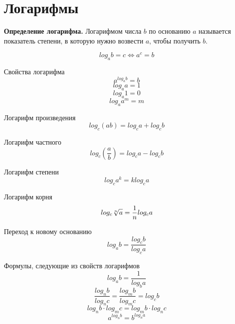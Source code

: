 \documentclass[a4paper, 12pt]{article}
\begin{document}
\section{Логарифмы}
\textbf{Определение логарифма.} Логарифмом числа $b$ по основанию $a$ называется показатель степени, в которую нужно возвести $a$, чтобы получить $b.$

$$log_ab=c \Leftrightarrow a^c=b$$
 
Свойства логарифма
$$a^{log_ab}=b$$
$$log_aa=1$$
$$log_a1=0$$
$$log_aa^m=m$$

Логарифм произведения
$$log_c(ab)=log_ca+log_cb$$

Логарифм частного
$$log_c(\frac{a}{b})=log_ca-log_cb$$

Логарифм степени
$$log_ca^k=klog_ca$$

Логарифм корня
$$log_c \root{n}\of{a}=\frac{1}{n}log_ca$$

Переход к новому основанию
$$log_ab=\frac{log_cb}{log_ca}$$

Формулы, следующие из свойств логарифмов
$$log_ab=\frac{1}{log_ba}$$
$$\frac{log_nb}{log_nc}=\frac{log_mb}{log_mc}=log_cb$$
$$log_nb\cdot log_mc=log_mb\cdot log_nc$$
$$a^{log_nb}=b^{log_na}$$
\end{document}
